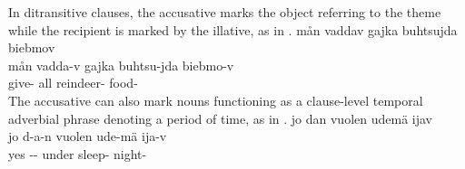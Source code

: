 In ditransitive clauses, the accusative marks the object referring to the theme while the recipient is marked by the illative, as in .
\ea\label{acc2}
\glll	mån vaddav gajka buhtsujda {biebmov}\\ %
	mån vadda-v gajka buhtsu-jda biebmo-v\\
	 give- all\BS{} reindeer- food-\\\nopagebreak
{} 
\z
The accusative can also mark nouns functioning as a clause-level temporal adverbial phrase denoting a period of time, %
as in .%
\ea\label{acc3}
\glll	jo dan vuolen udemä {ijav}\\ %
	jo d-a-n vuolen ude-mä ija-v\\
	yes -- under sleep- night-\\\nopagebreak
{} 
\z


